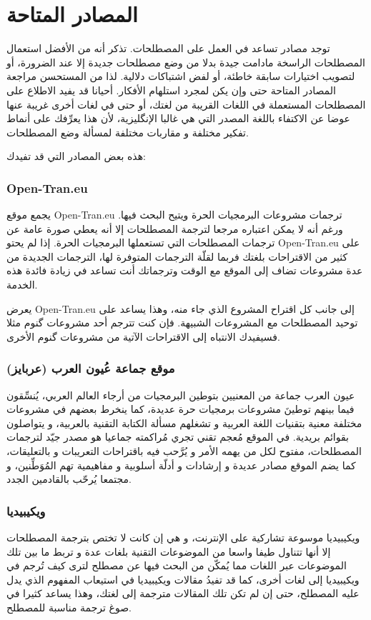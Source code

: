 \section{المصادر المتاحة}
توجد مصادر تساعد في العمل على المصطلحات. تذكر أنه من الأفضل استعمال
المصطلحات الراسخة مادامت جيدة بدلا من وضع مصطلحات جديدة إلا عند
الضرورة، أو لتصويب اختيارات سابقة خاطئة، أو لفض اشتباكات دلالية. لذا من
المستحسن مراجعة المصادر المتاحة حتى وإن يكن لمجرد استلهام الأفكار.
أحيانا قد يفيد الاطلاع على المصطلحات المستعملة في اللغات القريبة من
لغتك، أو حتى في لغات أخرى غريبة عنها عوضا عن الاكتفاء باللغة المصدر
التي هي غالبا الإنگليزية، لأن هذا يعرِّفك على أنماط تفكير مختلفة و
مقاربات مختلفة لمسألة وضع المصطلحات.

هذه بعض المصادر التي قد تفيدك:

\subsubsection{Open-Tran.eu}
يجمع موقع Open-Tran.eu ترجمات مشروعات البرمجيات الحرة ويتيح البحث فيها.
ورغم أنه لا يمكن اعتباره مرجعا لترجمة المصطلحات إلا أنه يعطي صورة عامة
عن ترجمات المصطلحات التي تستعملها البرمجيات الحرة. إذا لم يحتو
Open-Tran.eu على كثير من الاقتراحات بلغتك فربما لقلّة الترجمات المتوفرة
لها، الترجمات الجديدة من عدة مشروعات تضاف إلى الموقع مع الوقت وترجماتك
أنت تساعد في زيادة فائدة هذه الخدمة.

يعرض Open-Tran.eu إلى جانب كل اقتراح المشروع الذي جاء منه، وهذا يساعد
على توحيد المصطلحات مع المشروعات الشبيهة. فإن كنت تترجم أحد مشروعات
گنوم مثلا فسيفيدك الانتباه إلى الاقتراحات الآتية من مشروعات گنوم
الأخرى.


\subsubsection{موقع جماعة عُيون العرب (عربايز)}
عيون العرب جماعة من المعنيين بتوطين البرمجيات من أرجاء العالم العربي،
يُنسِّقون فيما بينهم توطينَ مشروعات برمجيات حرة عديدة، كما ينخرط بعضهم
في مشروعات مختلفة معنية بتقنيات اللغة العربية و تشغلهم مسألة الكتابة
التقنية بالعربية، و يتواصلون بقوائم بريدية. في الموقع مُعجم تقني تجري
مُراكمته جماعيا هو مصدر جيّد لترجمات المصطلحات، مفتوح لكل من يهمه الأمر
و يُرَّحب فيه باقتراحات التعريبات و بالتعليقات، كما يضم الموقع مصادر
عديدة و إرشادات و أدلّة أسلوبية و مفاهيمية تهم المُوَطِّنين، و مجتمعا
يُرحّب بالقادمين الجدد.


\subsubsection{ويكيبيديا}
ويكيبيديا موسوعة تشاركية على الإنترنت، و هي إن كانت لا تختص بترجمة
المصطلحات إلا أنها تتناول طيفا واسعا من الموضوعات التقنية بلغات عدة و
تربط ما بين تلك الموضوعات عبر اللغات مما يُمكّن من البحث فيها عن مصطلح
لترى كيف تُرجم في ويكيبيديا إلى لغات أخرى، كما قد تفيدُ مقالات
ويكيبيديا في استيعاب المفهوم الذي يدل عليه المصطلح، حتى إن لم تكن تلك
المقالات مترجمة إلى لغتك، وهذا يساعد كثيرا في صوغ ترجمة مناسبة للمصطلح.

